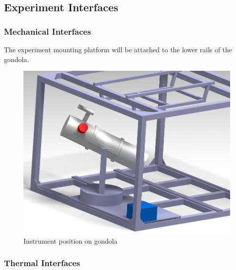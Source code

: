 \subsection{Experiment Interfaces}

\subsubsection{Mechanical Interfaces}
\label{sec:4.2.1}


The experiment mounting platform will be attached to the lower rails of the gondola.



\begin{figure}[H]
    \centering
	\includegraphics[width=0.9\linewidth]{4-experiment-design/img/interfaces/Assembly_3.png}
	\caption{Instrument position on gondola}
\end{figure}


% 


\subsubsection{Thermal Interfaces}


